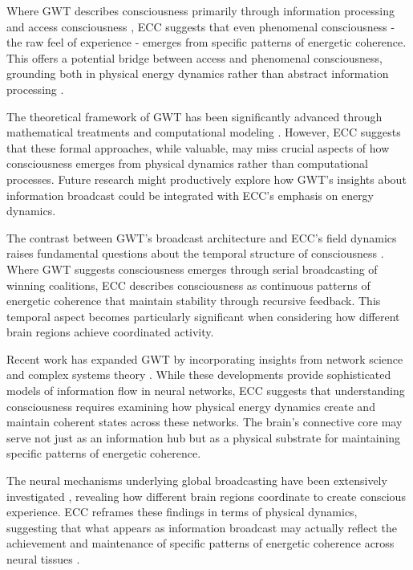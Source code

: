 Where GWT describes consciousness primarily through information processing and access consciousness \cite{Dehaene2014}, ECC suggests that even phenomenal consciousness - the raw feel of experience - emerges from specific patterns of energetic coherence. This offers a potential bridge between access and phenomenal consciousness, grounding both in physical energy dynamics rather than abstract information processing \cite{Mashour2020}.

The theoretical framework of GWT has been significantly advanced through mathematical treatments \cite{Wallace2005} and computational modeling \cite{Franklin1999}. However, ECC suggests that these formal approaches, while valuable, may miss crucial aspects of how consciousness emerges from physical dynamics rather than computational processes. Future research might productively explore how GWT's insights about information broadcast could be integrated with ECC's emphasis on energy dynamics.

The contrast between GWT's broadcast architecture and ECC's field dynamics raises fundamental questions about the temporal structure of consciousness \cite{Sergent2004}. Where GWT suggests consciousness emerges through serial broadcasting of winning coalitions, ECC describes consciousness as continuous patterns of energetic coherence that maintain stability through recursive feedback. This temporal aspect becomes particularly significant when considering how different brain regions achieve coordinated activity.

Recent work has expanded GWT by incorporating insights from network science and complex systems theory \cite{Shanahan2012}. While these developments provide sophisticated models of information flow in neural networks, ECC suggests that understanding consciousness requires examining how physical energy dynamics create and maintain coherent states across these networks. The brain's connective core may serve not just as an information hub but as a physical substrate for maintaining specific patterns of energetic coherence.

The neural mechanisms underlying global broadcasting have been extensively investigated \cite{Dehaene2014}, revealing how different brain regions coordinate to create conscious experience. ECC reframes these findings in terms of physical dynamics, suggesting that what appears as information broadcast may actually reflect the achievement and maintenance of specific patterns of energetic coherence across neural tissues \cite{Mashour2020}.

